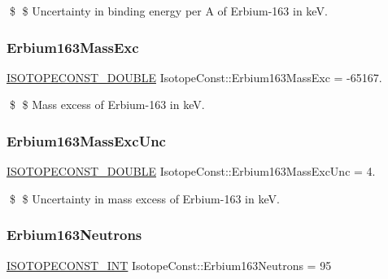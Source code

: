 \$ \$ Uncertainty in binding energy per A of Erbium-\/163 in keV. \mbox{\label{group___isotope_const-_erbium-_er163_gacd8d24689c075d54810b3ca765190494}} 
\subsubsection{\texorpdfstring{Erbium163\+Mass\+Exc}{Erbium163MassExc}}
{\footnotesize\ttfamily \mbox{\hyperlink{group___isotope_const-_macros_ga8f45a7272ce02c0b4c65c44636ed719a}{I\+S\+O\+T\+O\+P\+E\+C\+O\+N\+S\+T\+\_\+\+D\+O\+U\+B\+LE}} Isotope\+Const\+::\+Erbium163\+Mass\+Exc = -\/65167.}

\$ \$ Mass excess of Erbium-\/163 in keV. \mbox{\label{group___isotope_const-_erbium-_er163_ga76f668557ef01f1895850039fec66767}} 
\subsubsection{\texorpdfstring{Erbium163\+Mass\+Exc\+Unc}{Erbium163MassExcUnc}}
{\footnotesize\ttfamily \mbox{\hyperlink{group___isotope_const-_macros_ga8f45a7272ce02c0b4c65c44636ed719a}{I\+S\+O\+T\+O\+P\+E\+C\+O\+N\+S\+T\+\_\+\+D\+O\+U\+B\+LE}} Isotope\+Const\+::\+Erbium163\+Mass\+Exc\+Unc = 4.}

\$ \$ Uncertainty in mass excess of Erbium-\/163 in keV. \mbox{\label{group___isotope_const-_erbium-_er163_ga93e3c41630f8145bb8d5979d75148886}} 
\subsubsection{\texorpdfstring{Erbium163\+Neutrons}{Erbium163Neutrons}}
{\footnotesize\ttfamily \mbox{\hyperlink{group___isotope_const-_macros_ga5f18360b3e99483a35c32d789e62621c}{I\+S\+O\+T\+O\+P\+E\+C\+O\+N\+S\+T\+\_\+\+I\+NT}} Isotope\+Const\+::\+Erbium163\+Neutrons = 95}

